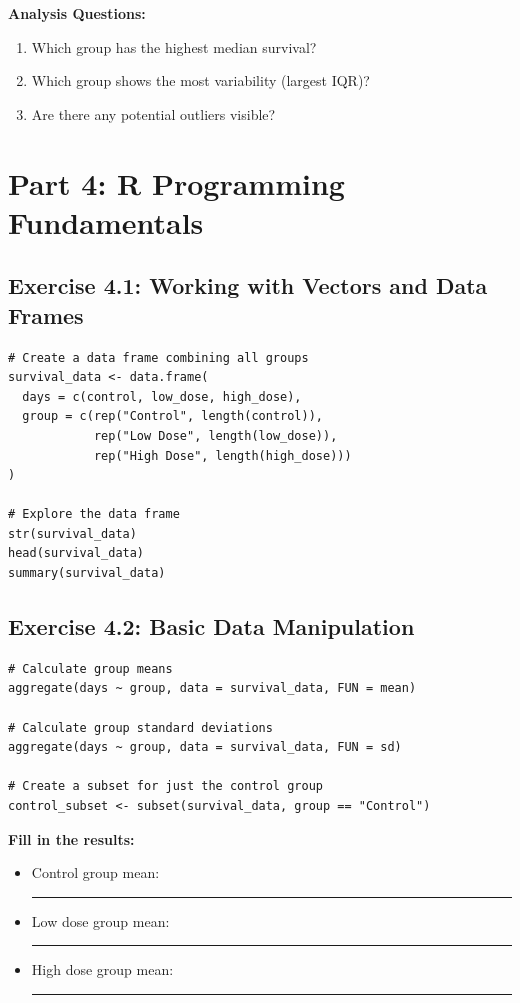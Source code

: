 \documentclass[11pt]{article}
\begin{document}
\textbf{Analysis Questions:}
\begin{enumerate}
\item Which group has the highest median survival?
\item Which group shows the most variability (largest IQR)?
\item Are there any potential outliers visible?
\end{enumerate}

\section{Part 4: R Programming Fundamentals}

\subsection{Exercise 4.1: Working with Vectors and Data Frames}

\begin{lstlisting}
# Create a data frame combining all groups
survival_data <- data.frame(
  days = c(control, low_dose, high_dose),
  group = c(rep("Control", length(control)),
            rep("Low Dose", length(low_dose)),
            rep("High Dose", length(high_dose)))
)

# Explore the data frame
str(survival_data)
head(survival_data)
summary(survival_data)
\end{lstlisting}

\subsection{Exercise 4.2: Basic Data Manipulation}

\begin{lstlisting}
# Calculate group means
aggregate(days ~ group, data = survival_data, FUN = mean)

# Calculate group standard deviations
aggregate(days ~ group, data = survival_data, FUN = sd)

# Create a subset for just the control group
control_subset <- subset(survival_data, group == "Control")
\end{lstlisting}

\textbf{Fill in the results:}
\begin{itemize}
\item Control group mean: \rule{3cm}{0.4pt}
\item Low dose group mean: \rule{3cm}{0.4pt}
\item High dose group mean: \rule{3cm}{0.4pt}
\end{itemize}
\end{document}
